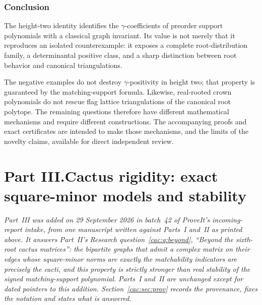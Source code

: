 \documentclass[11pt]{article}
\numberwithin{equation}{section}
\theoremstyle{definition}
\begin{document}
\section{Conclusion}\label{htwo:sec:conclusion}

The height-two identity identifies the $\gamma$-coefficients of preorder
support polynomials with a classical graph invariant. Its value is not
merely that it reproduces an isolated counterexample: it exposes a
complete root-distribution family, a determinantal positive class, and a
sharp distinction between root behavior and canonical triangulations.

The negative examples do not destroy $\gamma$-positivity in height two;
that property is guaranteed by the matching-support formula. Likewise,
real-rooted crown polynomials do not rescue flag lattice triangulations
of the canonical root polytope. The remaining questions therefore have
different mathematical mechanisms and require different constructions.
The accompanying proofs and exact certificates are intended to make those
mechanisms, and the limits of the novelty claims, available for direct
independent review.

\clearpage
{}\part*{Part III.\quad Cactus rigidity: exact square-minor models and stability}

\noindent\emph{Part~III was added on 29 September 2026 in batch~42 of
ProveIt's incoming-report intake, from one manuscript written against
Parts~I and~II as printed above. It answers Part~II's Research
question~\ref{cac:q:beyond}, ``Beyond the sixth-root cactus matrices'': the
bipartite graphs that admit a complex matrix on their edges whose
square-minor norms are exactly the matchability indicators are precisely the
cacti, and this property is strictly stronger than real stability of the
signed matching-support polynomial. Parts~I and~II are unchanged except for
dated pointers to this addition. Section~\ref{cac:sec:prov} records the
provenance, fixes the notation and states what is answered.}
\end{document}
